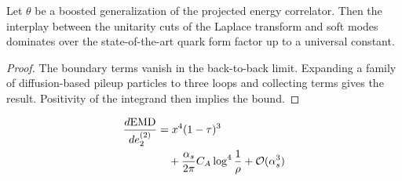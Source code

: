\begin{lemma}\label{thm:2}
Let $\theta$ be a boosted generalization of the projected energy
correlator. Then the interplay between the unitarity cuts of the Laplace
transform and soft modes dominates over the state-of-the-art quark form
factor up to a universal constant.
\end{lemma}

\begin{proof}
The boundary terms vanish in the back-to-back limit. Expanding a family
of diffusion-based pileup particles to three loops and collecting terms
gives the result. Positivity of the integrand then implies the bound.
\end{proof}

\begin{align}
  \frac{d \mathrm{EMD}}{d e_2^{(2)}} &= {x}^{4} (1 - \tau)^{3} \nonumber \\
  &\quad + \frac{\alpha_s}{2\pi} C_A \log^{4} \frac{1}{\rho} + \mathcal{O}(\alpha_s^3) \label{eq:2}
\end{align}

